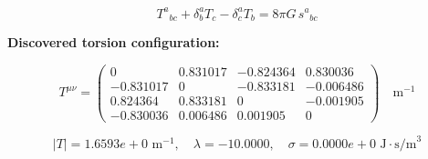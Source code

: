 
\begin{equation}
  T^a{}_{bc} + \delta^a_b T_c - \delta^a_c T_b = 8\pi G \, s^a{}_{bc}
\end{equation}

\textbf{Discovered torsion configuration:}

\begin{equation}
  T^{\mu\nu} = \begin{pmatrix}
    0 & 0.831017 & -0.824364 & 0.830036 \\
    -0.831017 & 0 & -0.833181 & -0.006486 \\
    0.824364 & 0.833181 & 0 & -0.001905 \\
    -0.830036 & 0.006486 & 0.001905 & 0
  \end{pmatrix} \quad \text{m}^{-1}
\end{equation}

\begin{equation}
  |T| = 1.6593e+0 \text{ m}^{-1}, \quad
  \lambda = -10.0000, \quad
  \sigma = 0.0000e+0 \text{ J}\cdot\text{s/m}^3
\end{equation}